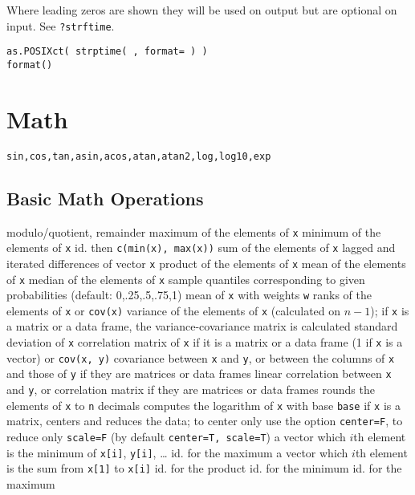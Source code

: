 Where leading zeros are shown they will be used on output but are
optional on input. See {\tt ?strftime}.

{\tt as.POSIXct( strptime( , format= ) )\\
    format()}

\section{Math}{{\tt sin,cos,tan,asin,acos,atan,atan2,log,log10,exp}}

\subsection{Basic Math Operations}{}
\cmdS{\%\%, \%/\%}	{modulo/quotient, remainder}
	{ maximum of the elements of {\tt x}}
	{ minimum of the elements of {\tt x}}
	{ id. then {\tt c(min(x), max(x))}}
	{ sum of the elements of {\tt x}}
	{ lagged and iterated differences of vector {\tt x}}
	{ product of the elements of {\tt x}}
	{ mean of the elements of {\tt x}}
	{ median of the elements of {\tt x}}
	{sample quantiles corresponding to given
    probabilities (default: 0,.25,.5,.75,1)}
	{mean of {\tt x} with weights {\tt w}}
	{ ranks of the elements of {\tt x}}
	{or {\tt cov(x)}  variance of the elements of {\tt x}
    (calculated on $n-1$); if {\tt x} is a matrix or a data frame, the
    variance-covariance matrix is calculated}
	{standard deviation of {\tt x}}
	{correlation matrix of {\tt x} if it is a matrix or a data frame (1 if {\tt x} is a vector)}
	{or {\tt cov(x, y)}  covariance between {\tt x} and {\tt y}, or between the columns of {\tt x} and those of {\tt y} if they are matrices or data frames}
	{linear correlation between {\tt x} and {\tt y}, or correlation matrix if they are matrices or data frames}
	{rounds the elements of {\tt x} to {\tt n} decimals}
	{computes the logarithm of {\tt x} with base {\tt base}}
	{if {\tt x} is a matrix, centers and reduces the data; to
center only use the option {\tt center=F}, to reduce only {\tt scale=F}
(by default {\tt center=T, scale=T})}
	{ a vector which $i$th element is the minimum of {\tt x[i]}, {\tt y[i]}, \ldots}
	{ id. for the maximum}
	{a vector which $i$th element is the sum from {\tt x[1]} to {\tt x[i]}}
	{ id. for the product}
	{ id. for the minimum}
	{ id. for the maximum}

